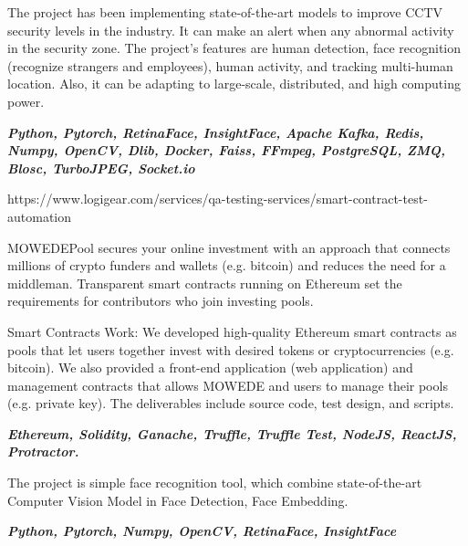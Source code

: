 \documentclass[10pt,a4paper,ragged2e,withhyper]{altacv}
\begin{document}

\begin{minipage}{\linewidth}
	\justifying
	
	The project has been implementing state-of-the-art models to improve CCTV security levels in the industry. It can make an alert when any abnormal activity in the security zone. The project's features are human detection, face recognition (recognize strangers and employees), human activity, and tracking multi-human location. Also, it can be adapting to large-scale, distributed, and high computing power.
	\smallskip
	
	\textit{\textbf{Python, Pytorch, RetinaFace, InsightFace, Apache Kafka, Redis, Numpy, OpenCV, Dlib, Docker, Faiss, FFmpeg, PostgreSQL, ZMQ, Blosc, TurboJPEG, Socket.io}}
\end{minipage}

\medskip

\divider

\medskip

 {https://www.logigear.com/services/qa-testing-services/smart-contract-test-automation}
\begin{minipage}{\linewidth}
	\justifying
	
	MOWEDEPool secures your online investment with an approach that connects millions of crypto funders and wallets (e.g. bitcoin) and reduces the need for a middleman. Transparent smart contracts running on Ethereum set the requirements for contributors who join investing pools.
	
	Smart Contracts Work: We developed high-quality Ethereum smart contracts as pools that let users together invest with desired tokens or cryptocurrencies (e.g. bitcoin). We also provided a front-end application (web application) and management contracts that allows MOWEDE and users to manage their pools (e.g. private key). The deliverables include source code, test design, and scripts.
	\smallskip
	
	\textit{\textbf{Ethereum, Solidity, Ganache, Truffle, Truffle Test, NodeJS, ReactJS, Protractor.}}
\end{minipage}

\medskip

\divider

\medskip


\begin{minipage}{\linewidth}
\justifying
The project is simple face recognition tool, which combine state-of-the-art Computer Vision Model in Face Detection, Face Embedding.
\smallskip

\textit{\textbf{Python, Pytorch, Numpy, OpenCV, RetinaFace, InsightFace}}
\end{minipage}
\end{document}
